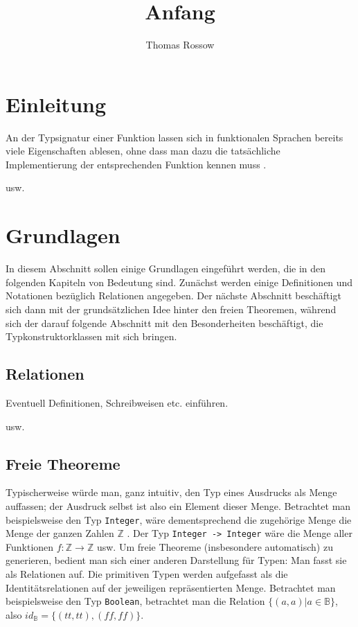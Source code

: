 \documentclass[11pt]{article} %
\title{Anfang}
\author{Thomas Rossow}
\begin{document}
\maketitle

\section{Einleitung}

An der Typsignatur einer Funktion lassen sich in funktionalen Sprachen bereits viele Eigenschaften ablesen, ohne dass man dazu die
tatsächliche Implementierung der entsprechenden Funktion kennen muss \cite{wadler}.

usw.

\section{Grundlagen}

In diesem Abschnitt sollen einige Grundlagen eingeführt werden, die in den folgenden Kapiteln von Bedeutung sind. Zunächst werden
einige Definitionen und Notationen bezüglich Relationen angegeben. Der nächste Abschnitt beschäftigt sich dann mit der
grundsätzlichen Idee hinter den freien Theoremen, während sich der darauf folgende Abschnitt mit den Besonderheiten beschäftigt,
die Typkonstruktorklassen mit sich bringen.

\subsection{Relationen}

Eventuell Definitionen, Schreibweisen etc. einführen.

usw.

\subsection{Freie Theoreme}
\label{sec:freie-theoreme}

Typischerweise würde man, ganz intuitiv, den Typ eines Ausdrucks als Menge auffassen; der Ausdruck selbst ist also ein
Element dieser Menge. Betrachtet man beispielsweise den Typ \texttt{Integer},
wäre dementsprechend die zugehörige Menge die Menge der ganzen Zahlen $\mathbb{Z}$ \cite{bla}. Der Typ
\texttt{Integer -> Integer} wäre die Menge aller Funktionen $f : \mathbb{Z} \rightarrow \mathbb{Z}$ usw.
Um freie Theoreme (insbesondere automatisch) zu generieren, bedient man sich einer anderen Darstellung für Typen: Man fasst
sie als Relationen auf. Die primitiven Typen werden aufgefasst als die Identitätsrelationen auf der jeweiligen repräsentierten Menge. Betrachtet man beispielsweise den Typ \texttt{Boolean}, betrachtet man die Relation $\{ (a, a) | a \in \mathbb{B} \}$, also
$id_{\mathbb{B}} = \{({tt}, {tt}), ({ff}, {ff})\}$.
\end{document}
